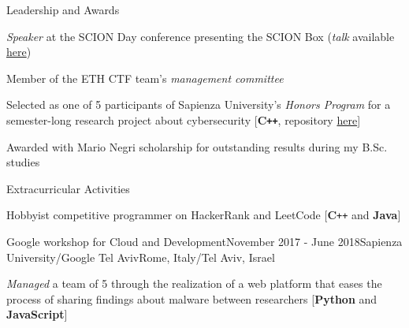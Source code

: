 \documentclass{resume}
\begin{document}
\begin{rSection}{Leadership and Awards}

\begin{rSubsection}{}{}{}{}
\item \textit{Speaker} at the SCION Day conference presenting the SCION Box (\textit{talk} available \href{https://video.ethz.ch/events/2019/scion/61dd8a87-3894-489d-99d3-77ca66c5ad38.html}{here})
\item Member of the ETH CTF team's \textit{management committee}
\item Selected as one of 5 participants of Sapienza University's \textit{Honors Program} for a semester-long research project about cybersecurity [\textbf{C\texttt{++}}, repository \href{https://github.com/andreatulimiero/PinCFGReconstructor}{here}]
\item Awarded with Mario Negri scholarship for outstanding results during my B.Sc. studies
\end{rSubsection}

\end{rSection}



\begin{rSection}{Extracurricular Activities}

\begin{rSubsection}{}{}{}{}
\item Hobbyist competitive programmer on HackerRank and LeetCode [\textbf{C}\texttt{++} and \textbf{Java}]
\end{rSubsection}
\begin{rSubsection}{Google workshop for Cloud and Development}{November 2017 - June 2018}{Sapienza University/Google Tel Aviv}{Rome, Italy/Tel Aviv, Israel}
\item \textit{Managed} a team of 5 through the realization of a web platform that eases the process of sharing findings about malware between researchers [\textbf{Python} and \textbf{JavaScript}]
\end{rSubsection}

\end{rSection}






\end{document}
